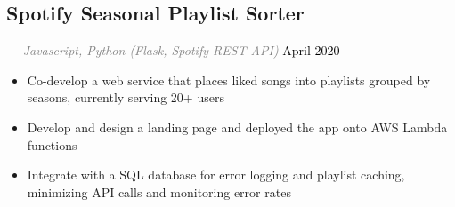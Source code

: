 \documentclass{article}
\newcommand{\resumesection}[3]{
    \subsection*{#1}
    \ 
    \ 
    \small
    \textcolor{grey}{\emph{#2}}
    \normalsize
    \hfill
    \textcolor{black}{#3}
    \normalsize
}
\begin{document}
\resumesection{Spotify Seasonal Playlist Sorter}{Javascript, Python (Flask, Spotify REST API)}{April 2020}
\begin{itemize}
    \item Co-develop a web service that places liked songs into playlists grouped by seasons, currently serving 20+ users
    \item Develop and design a landing page and deployed the app onto AWS Lambda functions
    \item Integrate with a SQL database for error logging and playlist caching, minimizing API calls and monitoring error rates
\end{itemize}


\end{document}
